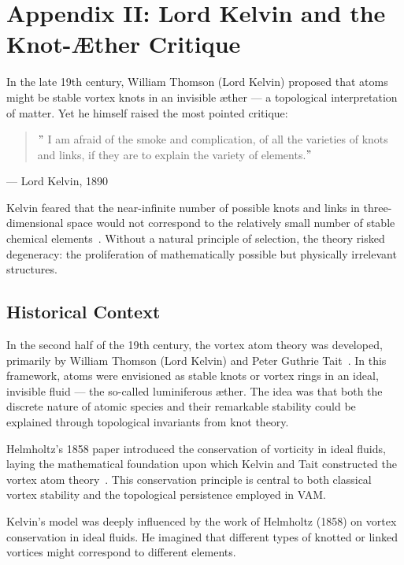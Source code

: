 \documentclass[preprint,notitlepage]{revtex4-2}
\begin{document}
\section*{Appendix II: Lord Kelvin and the Knot-Æther Critique}
\label{appendix:kelvin}

    In the late 19th century, William Thomson (Lord Kelvin) proposed that atoms might be stable vortex knots in an invisible æther — a topological interpretation of matter. Yet he himself raised the most pointed critique:

    \begin{quote}
    \("\) I am afraid of the smoke and complication, of all the varieties of knots and links, if they are to explain the variety of elements.\("\)
    \end{quote}
 \hfill  — Lord Kelvin, 1890

    Kelvin feared that the near-infinite number of possible knots and links in three-dimensional space would not correspond to the relatively small number of stable chemical elements~\cite{thomson1890knots, tait1877knots}. Without a natural principle of selection, the theory risked degeneracy: the proliferation of mathematically possible but physically irrelevant structures.

    \subsection*{Historical Context}

    In the second half of the 19th century, the vortex atom theory was developed, primarily by William Thomson (Lord Kelvin) and Peter Guthrie Tait~\cite{thomson1890knots, tait1877knots}. In this framework, atoms were envisioned as stable knots or vortex rings in an ideal, invisible fluid — the so-called luminiferous æther. The idea was that both the discrete nature of atomic species and their remarkable stability could be explained through topological invariants from knot theory.

    Helmholtz's 1858 paper introduced the conservation of vorticity in ideal fluids, laying the mathematical foundation upon which Kelvin and Tait constructed the vortex atom theory~\cite{helmholtz1858vortices}. This conservation principle is central to both classical vortex stability and the topological persistence employed in VAM.

    Kelvin's model was deeply influenced by the work of Helmholtz (1858) on vortex conservation in ideal fluids. He imagined that different types of knotted or linked vortices might correspond to different elements.
\end{document}
